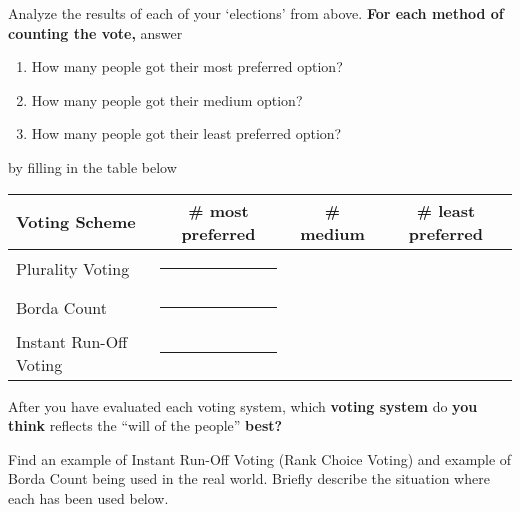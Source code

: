 \documentclass[nooutcomes,noauthor,hints,handout]{ximera}
\begin{document}
\begin{question}
  Analyze the results of each of your `elections' from above. \textbf{For each
  method of counting the vote,} answer
  \begin{enumerate}
  \item How many people got their most preferred option?
  \item How many people got their medium option? 
  \item How many people got their least preferred option?
  \end{enumerate}
  by filling in the table below
  \begin{center}\renewcommand{\arraystretch}{1.5}
    \begin{tabular}{|l||c|c|c|}\hline
      Voting Scheme & \# most preferred & \# medium & \# least preferred \\ \hline\hline
      Plurality  Voting &  \rule[7mm]{10mm}{0mm}& & \\ \hline
      Borda Count &  \rule[7mm]{10mm}{0mm}&  & \\ \hline
      Instant Run-Off Voting & \rule[7mm]{10mm}{0mm}&  &\\\hline
    \end{tabular}
  \end{center}
  
  After you have evaluated each voting system, which \textbf{voting system} do
  \textbf{you think} reflects the ``will of the people'' \textbf{best?}
\end{question}
\mynewpage








\begin{question}
  Find an example of Instant Run-Off Voting (Rank Choice Voting) and
  example of Borda Count being used in the real world. Briefly
  describe the situation where each has been used below.
    
\end{question}
\end{document}

